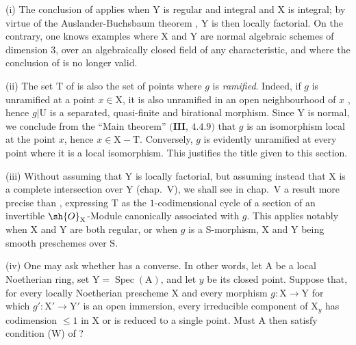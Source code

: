 \begin{remarks}[21.12.14]
\label{IV.21.12.14}
(i)
The conclusion of  applies when $\mathrm{Y}$ is regular and integral and $\mathrm{X}$ is integral; by virtue of the Auslander-Buchsbaum theorem , $\mathrm{Y}$ is then locally factorial.
On the contrary, one knows examples where $\mathrm{X}$ and $\mathrm{Y}$ are normal algebraic schemes of dimension $3$, over an algebraically closed field of any characteristic, and where the conclusion of  is no longer valid.

(ii)
The set $\mathrm{T}$ of  is also the set of points where $g$ is \emph{ramified}.
Indeed, if $g$ is unramified at a point $x\in\mathrm{X}$, it is also unramified in an open neighbourhood of $x$ , hence $g|\mathrm{U}$ is a separated, quasi-finite and birational morphism.
Since $\mathrm{Y}$ is normal, we conclude from the ``Main theorem'' $(\mathbf{III}$, $4.4.9)$ that $g$ is an isomorphism local at the point $x$, hence $x\in\mathrm{X}-\mathrm{T}$.
Conversely, $g$ is evidently unramified at every point where it is a local isomorphism.
This justifies the title given to this section.

(iii)
Without assuming that $\mathrm{Y}$ is locally factorial, but assuming instead that $\mathrm{X}$ is a complete intersection over $\mathrm{Y}$ (chap.~V), we shall see in chap.~V a result more precise than , expressing $\mathrm{T}$ as the $1$-codimensional cycle of a section of an invertible $\sh{O}_{\mathrm{X}}$-Module canonically associated with $g$.
This applies notably when $\mathrm{X}$ and $\mathrm{Y}$ are both regular, or when $g$ is a S-morphism, $\mathrm{X}$ and $\mathrm{Y}$ being smooth preschemes over $\mathrm{S}$.

(iv) One may ask whether  has a converse.  In other words, let $\mathrm{A}$ be a local Noetherian ring, set $\mathrm{Y}=\operatorname{Spec}(\mathrm{A})$, and let $y$ be its closed point.  Suppose that, for every locally Noetherian prescheme $\mathrm{X}$ and every morphism $g:\mathrm{X}\to\mathrm{Y}$ for which $g':\mathrm{X}'\to\mathrm{Y}'$ is an open immersion, every irreducible component of $\mathrm{X}_y$ has codimension $\leq 1$ in $\mathrm{X}$ or is reduced to a single point.  Must $\mathrm{A}$ then satisfy condition (W) of ?


\end{remarks}
